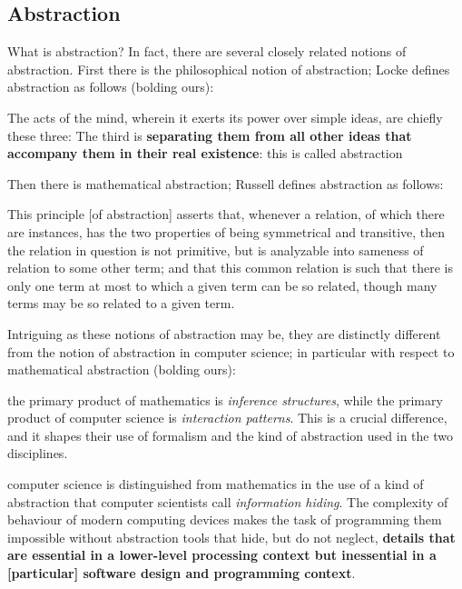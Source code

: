 \subsection{Abstraction}\label{subsec:abstraction}
What is abstraction?
In fact, there are several closely related notions of abstraction.
First there is the philosophical notion of abstraction;
Locke defines abstraction as follows (bolding ours):
\begin{displayquote}
    The acts of the mind, wherein it exerts its power over simple ideas, are chiefly these three: \textellipsis
    The third is \textbf{separating them from all other ideas that accompany them in their real existence}: this is called abstraction \textellipsis
\end{displayquote}
Then there is mathematical abstraction;
Russell defines abstraction as follows:
\begin{displayquote}
    This principle [of abstraction] asserts that, whenever a relation, of which there are instances, has the two properties of being symmetrical and transitive, then the relation in question is not primitive, but is analyzable into sameness of relation to some other term;
    and that this common relation is such that there is only one term at most to which a given term can be so related, though many terms may be so related to a given term.
\end{displayquote}
Intriguing as these notions of abstraction may be, they are distinctly different from the notion of abstraction in computer science;
in particular with respect to mathematical abstraction (bolding ours):
\begin{displayquote}
    \textellipsis the primary product of mathematics is \textit{inference structures}, while the primary product of computer science is \textit{interaction patterns}.
    This is a crucial difference, and it shapes their use of formalism and the kind of abstraction used in the two disciplines.

    \vspace{4pt}

    \textellipsis computer science is distinguished from mathematics in the use of a kind of abstraction that computer scientists call \textit{information hiding}.
    The complexity of behaviour of modern computing devices makes the task of programming them impossible without abstraction tools that hide, but do not neglect, \textbf{details that are essential in a lower-level processing context but inessential in a [particular] software design and programming context}.
\end{displayquote}
